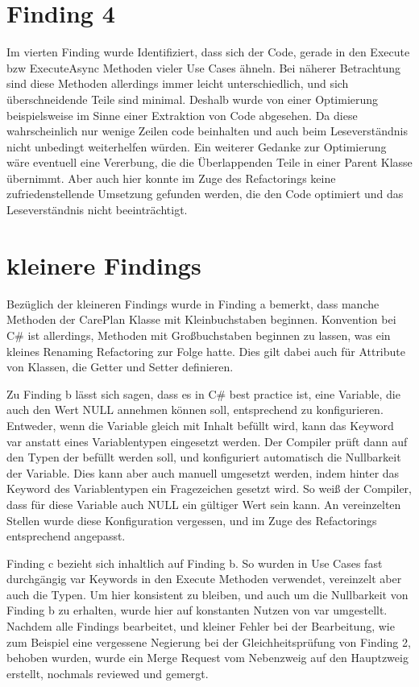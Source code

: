 \section{Finding 4}
Im vierten Finding wurde Identifiziert, dass sich der Code, gerade in den Execute bzw ExecuteAsync Methoden vieler Use Cases ähneln. Bei näherer Betrachtung sind diese Methoden allerdings immer leicht unterschiedlich, und sich überschneidende Teile sind minimal. Deshalb wurde von einer Optimierung beispielsweise im Sinne einer Extraktion von Code abgesehen. Da diese wahrscheinlich nur wenige Zeilen code beinhalten und auch beim Leseverständnis nicht unbedingt weiterhelfen würden. Ein weiterer Gedanke zur Optimierung wäre eventuell eine Vererbung, die die Überlappenden Teile in einer Parent Klasse übernimmt. Aber auch hier konnte im Zuge des Refactorings keine zufriedenstellende Umsetzung gefunden werden, die den Code optimiert und das Leseverständnis nicht beeinträchtigt.
\section{kleinere Findings}
Bezüglich der kleineren Findings wurde in Finding a bemerkt, dass manche Methoden der CarePlan Klasse mit Kleinbuchstaben beginnen. Konvention bei C\# ist allerdings, Methoden mit Großbuchstaben beginnen zu lassen, was ein kleines Renaming Refactoring zur Folge hatte. Dies gilt dabei auch für Attribute von Klassen, die Getter und Setter definieren.
\par
Zu Finding b lässt sich sagen, dass es in C\# best practice ist, eine Variable, die auch den Wert NULL annehmen können soll, entsprechend zu konfigurieren. Entweder, wenn die Variable gleich mit Inhalt befüllt wird, kann das Keyword var anstatt eines Variablentypen eingesetzt werden. Der Compiler prüft dann auf den Typen der befüllt werden soll, und konfiguriert automatisch die Nullbarkeit der Variable. Dies kann aber auch manuell umgesetzt werden, indem hinter das Keyword des Variablentypen ein Fragezeichen gesetzt wird. So weiß der Compiler, dass für diese Variable auch NULL ein gültiger Wert sein kann.
An vereinzelten Stellen wurde diese Konfiguration vergessen, und im Zuge des Refactorings entsprechend angepasst.
\par
Finding c bezieht sich inhaltlich auf Finding b. So wurden in Use Cases fast durchgängig var Keywords in den Execute Methoden verwendet, vereinzelt aber auch die Typen. Um hier konsistent zu bleiben, und auch um die Nullbarkeit von Finding b zu erhalten, wurde hier auf konstanten Nutzen von var umgestellt.
Nachdem alle Findings bearbeitet, und kleiner Fehler bei der Bearbeitung, wie zum Beispiel eine vergessene Negierung bei der Gleichheitsprüfung von Finding 2, behoben wurden, wurde ein Merge Request vom Nebenzweig auf den Hauptzweig erstellt, nochmals reviewed und gemergt.

 
